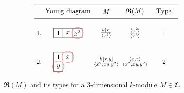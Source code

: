 \documentclass[12pt,a4paper]{article}
\begin{document}
		\begin{figure}[H]
			$$	\begin{tikzpicture} [scale=0.5]
				\draw[-](0,6) -- (15,6);
				\draw[-](0,7.5) -- (15,7.5);	 		
				\node (P) at (3.5, 6.75) {Young diagram};
				\node (P) at (7.5, 6.75) {\textbf{$M$}};
				\node (P) at (10.5, 6.75) {$\mathfrak{R}(M)$};
				\node (P) at (13.5, 6.75) {Type};
				
				\node (P) at (0.5, 4.5) {1.};
				
				\draw[-](2, 4) -- (5, 4);
				\draw[-](2, 5) -- (5, 5);
				\draw[-] (2, 4) -- (2, 5);
				\draw[-] (5, 4) -- (5, 5);
				\draw[-] (3, 4) -- (3, 5);
				\draw[-] (4, 4) -- (4, 5);
				
				\node (P) at (2.5, 4.5) {1 };
				\node (P) at (3.5, 4.5) {$x$ };
				\node[circle, draw=red!80, inner sep=0pt, minimum size=17pt ] (c) at (4.5,4.5) {$x^2$};
				
				\node (P) at (7.5, 4.5) { $\frac{k[x]} {\langle x^3 \rangle}$};
				
				\node (P) at (10.5, 4.5) { $\frac{\langle x^2 \rangle} {\langle x^3 \rangle}$};
				\node (P) at (13.5, 4.5) {1};
				
				\node (P) at (0.5, 1.5) {2.};
				
				\draw[-](2, 0.5) -- (3, 0.5);
				\draw[-](2, 1.5) -- (4, 1.5);
				\draw[-] (2, 2.5) -- (4, 2.5);
				\draw[-] (3, 0.5) -- (3, 2.5);
				\draw[-] (4, 1.5) -- (4, 2.5);
				\draw[-] (2, 0.5) -- (2, 2.5);
				
				\node (P) at (2.5, 2) {1 };
				\node [circle, draw=red!80, inner sep=0pt, minimum size=17pt] (c) at (3.5, 2)  {$x$};
				\node [circle, draw=red!80, inner sep=0pt, minimum size=17pt] (c) at (2.5, 1)  {$y$};
				
				\node (P) at (7.5, 1.5) { $  \frac{k[x,y]}{\langle x^2, xy, y^2\rangle}$};	
				\node (P) at (10.5, 1.5) { $\frac{\langle  x,y \rangle} {\langle x^2, xy, y^2\rangle}$};
				
				\node (P) at (13.5, 1.5) {2};
				
%				
%				
%				
%				
			\end{tikzpicture}$$
			\caption{ $\mathfrak{R}(M)$ and its types for a $3$-dimensional $k$-module $M\in \mathfrak{C}$.}
			

\end{figure}
\end{document}

